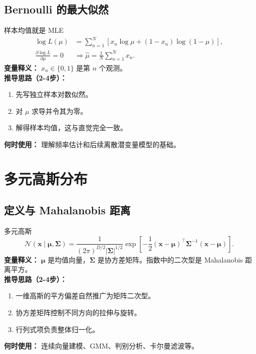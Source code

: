 \documentclass[11pt]{article}
\begin{document}
\subsection{Bernoulli 的最大似然}
\begin{formulabox}{样本均值就是 MLE}
\begin{align}
\log L(\mu)
&=\sum_{n=1}^{N}\left[x_n\log \mu +(1-x_n)\log(1-\mu)\right],\\
\frac{\partial \log L}{\partial \mu}=0
&\Rightarrow \hat{\mu}=\frac{1}{N}\sum_{n=1}^{N}x_n.
\end{align}
\textbf{变量释义：} $x_n\in\{0,1\}$ 是第 $n$ 个观测。\\
\textbf{推导思路（2-4步）：}
\begin{enumerate}[leftmargin=1.6em]
  \item 先写独立样本对数似然。
  \item 对 $\mu$ 求导并令其为零。
  \item 解得样本均值，这与直觉完全一致。
\end{enumerate}
\textbf{何时使用：} 理解频率估计和后续离散潜变量模型的基础。
\end{formulabox}

\section{多元高斯分布}
\subsection{定义与 Mahalanobis 距离}
\begin{formulabox}{多元高斯}
\begin{equation}
\mathcal N(\mathbf{x}\mid \boldsymbol{\mu},\mathbf{\Sigma})
=\frac{1}{(2\pi)^{D/2}|\mathbf{\Sigma}|^{1/2}}
\exp\left[-\frac{1}{2}(\mathbf{x}-\boldsymbol{\mu})^\top
\mathbf{\Sigma}^{-1}(\mathbf{x}-\boldsymbol{\mu})\right].
\end{equation}
\textbf{变量释义：} $\boldsymbol{\mu}$ 是均值向量，$\mathbf{\Sigma}$ 是协方差矩阵。指数中的二次型是 Mahalanobis 距离平方。\\
\textbf{推导思路（2-4步）：}
\begin{enumerate}[leftmargin=1.6em]
  \item 一维高斯的平方偏差自然推广为矩阵二次型。
  \item 协方差矩阵控制不同方向的拉伸与旋转。
  \item 行列式项负责整体归一化。
\end{enumerate}
\textbf{何时使用：} 连续向量建模、GMM、判别分析、卡尔曼滤波等。
\end{formulabox}
\end{document}
